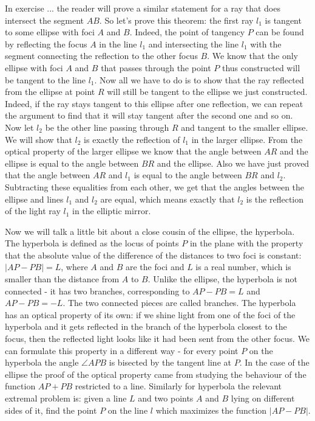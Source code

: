 In exercise ... the reader will prove a similar statement for a ray that does intersect the segment $AB$.
So let's prove this theorem: the first ray $l_1$ is tangent to some ellipse with foci $A$ and $B$. Indeed, the point of tangency $P$ can be found by reflecting the focus $A$ in the line $l_1$ and intersecting the line $l_1$ with the segment connecting the reflection to the other focus $B$. We know that the only ellipse with foci $A$ and $B$ that passes through the point $P$ thus constructed will be tangent to the line $l_1$. Now all we have to do is to show that the ray reflected from the ellipse at point $R$ will still be tangent to the ellipse we just constructed. Indeed, if the ray stays tangent to this ellipse after one reflection, we can repeat the argument to find that it will stay tangent after the second one and so on.
Now let $l_2$ be the other line passing through $R$ and tangent to the smaller ellipse. We will show that $l_2$ is exactly the reflection of $l_1$ in the larger ellipse. From the optical property of the larger ellipse we know that the angle between $AR$ and the ellipse is equal to the angle between $BR$ and the ellipse. Also we have just proved that the angle between $AR$ and $l_1$ is equal to the angle between $BR$ and $l_2$. Subtracting these equalities from each other, we get that the angles between the ellipse and lines $l_1$ and $l_2$ are equal, which means exactly that $l_2$ is the reflection of the light ray $l_1$ in the elliptic mirror.

Now we will talk a little bit about a close cousin of the ellipse, the hyperbola. The hyperbola is defined as the locus of points $P$ in the plane with the property that the absolute value of the difference of the distances to two foci is constant: $|AP-PB|=L$, where $A$ and $B$ are the foci and $L$ is a real number, which is smaller than the distance from $A$ to $B$.
Unlike the ellipse, the hyperbola is not connected - it has two branches, corresponding to $AP-PB=L$ and $AP-PB=-L$. The two connected pieces are called branches.
The hyperbola has an optical property of its own: if we shine light from one of the foci of the hyperbola and it gets reflected in the branch of the hyperbola closest to the focus, then the reflected light looks like it had been sent from the other focus.
We can formulate this property in a different way - for every point $P$ on the hyperbola the angle $\angle APB$ is bisected by the tangent line at $P$.
In the case of the ellipse the proof of the optical property came from studying the behaviour of the function $AP+PB$ restricted to a line. Similarly for hyperbola the relevant extremal problem is: given a line $L$ and two points $A$ and $B$ lying on different sides of it, find the point $P$ on the line $l$ which maximizes the function $|AP-PB|$.

